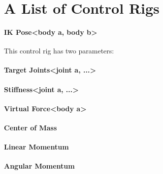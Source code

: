 \section{A List of Control Rigs}

\paragraph{IK Pose<body a, body b>}
This control rig has two parameters: 
\paragraph{Target Joints<joint a, ...>}
\paragraph{Stiffness<joint a, ...>}
\paragraph{Virtual Force<body a>}
\paragraph{Center of Mass}
\paragraph{Linear Momentum}
\paragraph{Angular Momentum}